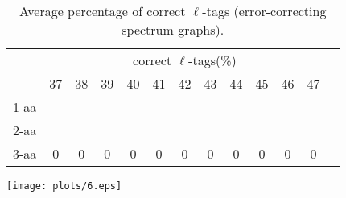 \documentclass{article}
\begin{document}
\begin{table}[h]\tiny
\vspace{3mm}
{\centering
\begin{center}
\begin{tabular}{|l|c|c|c|c|c|c|c|c|c|c|c|c|}
  \hline
  & \multicolumn{ 11 }{|c|}{correct $\ell$-tags(\%)} \\
  \cline{2- 12}
    & 37 & 38 & 39 & 40 & 41 & 42 & 43 & 44 & 45 & 46 & 47\\
  \hline
1-aa  &  &  &  &  &  &  &  &  &  &  & \\
2-aa  &  &  &  &  &  &  &  &  &  &  & \\
3-aa  & 0 & 0 & 0 & 0 & 0 & 0 & 0 & 0 & 0 & 0 & 0\\
 \hline
\end{tabular}
\end{center}
\par}
\centering

\caption{ Average percentage of correct $\ell$-tags (error-correcting spectrum graphs).}

\vspace{3mm}
\label{table:table5}
\end{table}
\texttt{[image: plots/6.eps]}
\end{document}
